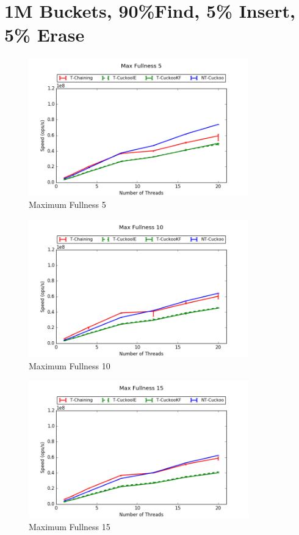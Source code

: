 \section{1M Buckets, 90\%Find, 5\% Insert, 5\% Erase}
\begin{figure}[H]
    \centering
	\includegraphics[width=0.85\textwidth]{maps/5HM1M:F90,I5,E5.png} 
        \caption*{Maximum Fullness 5}
\end{figure}
\begin{figure}[H]
    \centering
	\includegraphics[width=0.85\textwidth]{maps/10HM1M:F90,I5,E5.png} 
        \caption*{Maximum Fullness 10}
\end{figure}
\begin{figure}[H]
    \centering
	\includegraphics[width=0.85\textwidth]{maps/15HM1M:F90,I5,E5.png} 
        \caption*{Maximum Fullness 15}
\end{figure}


